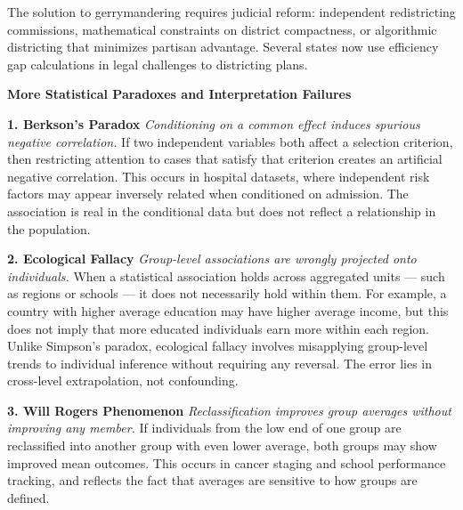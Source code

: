 The solution to gerrymandering requires judicial reform: independent redistricting commissions, mathematical constraints on district compactness, or algorithmic districting that minimizes partisan advantage. Several states now use efficiency gap calculations in legal challenges to districting plans.

\vspace*{\fill}

\clearpage

\begin{center}
{\Large \textbf{More Statistical Paradoxes and Interpretation Failures}}

\end{center}

\vspace{1em}

\begin{tcolorbox}[
  colback=gray!2,
  colframe=gray!60,
  boxrule=0.4pt,
  width=\textwidth,
  arc=1pt,
  left=8pt,
  right=8pt,
  top=6pt,
  bottom=6pt,
  shadow={0mm}{-0.5mm}{0mm}{gray!30}
]

\textbf{1. Berkson’s Paradox}  
\emph{Conditioning on a common effect induces spurious negative correlation.}  
If two independent variables both affect a selection criterion, then restricting attention to cases that satisfy that criterion creates an artificial negative correlation. This occurs in hospital datasets, where independent risk factors may appear inversely related when conditioned on admission. The association is real in the conditional data but does not reflect a relationship in the population.

\vspace{1em}

\textbf{2. Ecological Fallacy}  
\emph{Group-level associations are wrongly projected onto individuals.}  
When a statistical association holds across aggregated units — such as regions or schools — it does not necessarily hold within them. For example, a country with higher average education may have higher average income, but this does not imply that more educated individuals earn more within each region. Unlike Simpson’s paradox, ecological fallacy involves misapplying group-level trends to individual inference without requiring any reversal. The error lies in cross-level extrapolation, not confounding.

\vspace{1em}

\textbf{3. Will Rogers Phenomenon}  
\emph{Reclassification improves group averages without improving any member.}  
If individuals from the low end of one group are reclassified into another group with even lower average, both groups may show improved mean outcomes. This occurs in cancer staging and school performance tracking, and reflects the fact that averages are sensitive to how groups are defined.


\end{tcolorbox}
